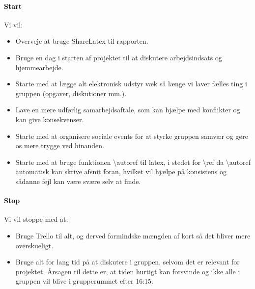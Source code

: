 \documentclass[oneside,a4paper,titlepage]{article}
\begin{document}
\paragraph{Start}
Vi vil:
\begin{itemize}
  \item Overveje at bruge ShareLatex til rapporten. 
  \item Bruge en dag i starten af projektet til at diskutere arbejdsindsats og hjemmearbejde. 
  \item Starte med at lægge alt elektronisk udstyr væk så længe vi laver fælles ting i gruppen (opgaver, diskutioner mm.).
  \item Lave en mere udførlig samarbejdsaftale, som kan hjælpe med konflikter og kan give konsekvenser. 
  \item Starte med at organisere sociale events for at styrke gruppen samvær og gøre os mere trygge ved hinanden.
  \item Starte med at bruge funktionen \textbackslash autoref til latex, i stedet for \textbackslash ref da \textbackslash autoref automatisk kan skrive afsnit foran, hvilket vil hjælpe på konsistens og sådanne fejl kan være svære selv at finde.
\end{itemize}

\paragraph{Stop}
Vi vil stoppe med at:
\begin{itemize}
  \item Bruge Trello til alt, og derved formindske mængden af kort så det bliver mere overskueligt.
  \item Bruge alt for lang tid på at diskutere i gruppen, selvom det er relevant for projektet. Årsagen til dette er, at tiden hurtigt kan forsvinde og ikke alle i gruppen vil blive i grupperummet efter 16:15.
\end{itemize}
\end{document}
